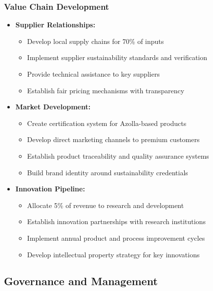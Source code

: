 \subsubsection{Value Chain Development}
\begin{itemize}
    \item \textbf{Supplier Relationships:}
    \begin{itemize}
        \item Develop local supply chains for 70\% of inputs
        \item Implement supplier sustainability standards and verification
        \item Provide technical assistance to key suppliers
        \item Establish fair pricing mechanisms with transparency
    \end{itemize}
    
    \item \textbf{Market Development:}
    \begin{itemize}
        \item Create certification system for Azolla-based products
        \item Develop direct marketing channels to premium customers
        \item Establish product traceability and quality assurance systems
        \item Build brand identity around sustainability credentials
    \end{itemize}
    
    \item \textbf{Innovation Pipeline:}
    \begin{itemize}
        \item Allocate 5\% of revenue to research and development
        \item Establish innovation partnerships with research institutions
        \item Implement annual product and process improvement cycles
        \item Develop intellectual property strategy for key innovations
    \end{itemize}
\end{itemize}

\subsection{Governance and Management}

